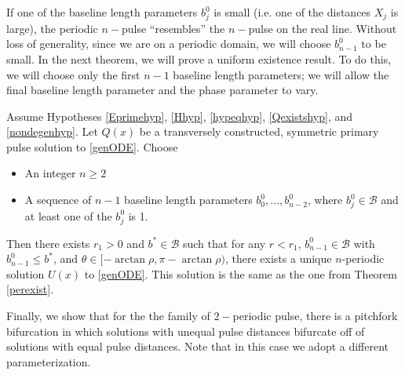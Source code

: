 \documentclass[thesis.tex]{subfiles}
\begin{document}
If one of the baseline length parameters $b_j^0$ is small (i.e. one of the distances $X_j$ is large), the periodic $n-$pulse ``resembles'' the $n-$pulse on the real line. Without loss of generality, since we are on a periodic domain, we will choose $b_{n-1}^0$ to be small. In the next theorem, we will prove a uniform existence result. To do this, we will choose only the first $n-1$ baseline length parameters; we will allow the final baseline length parameter and the phase parameter to vary. 

\begin{theorem}\label{unifperexist}
Assume Hypotheses \ref{Eprimehyp}, \ref{Hhyp}, \ref{hypeqhyp}, \ref{Qexistshyp}, and \ref{nondegenhyp}. Let $Q(x)$ be a transversely constructed, symmetric primary pulse solution to \eqref{genODE}. Choose
\begin{itemize}
\item An integer $n \geq 2$ 
\item A sequence of $n-1$ baseline length parameters $b_0^0, \dots, b_{n-2}^0$, where $b_j^0 \in \mathcal{B}$ and at least one of the $b_j^0$ is 1.
\end{itemize}
Then there exists $r_1 > 0$ and $b^* \in \mathcal{B}$ such that for any $r < r_1$, $b_{n-1}^0 \in \mathcal{B}$ with $b_{n-1}^0 \leq b^*$, and $\theta \in [-\arctan \rho, \pi - \arctan \rho)$, there exists a unique $n$-periodic solution $U(x)$ to \eqref{genODE}. This solution is the same as the one from Theorem \ref{perexist}.
\end{theorem}

Finally, we show that for the the family of $2-$periodic pulse, there is a pitchfork bifurcation in which solutions with unequal pulse distances bifurcate off of solutions with equal pulse distances. Note that in this case we adopt a different parameterization.
\end{document}
